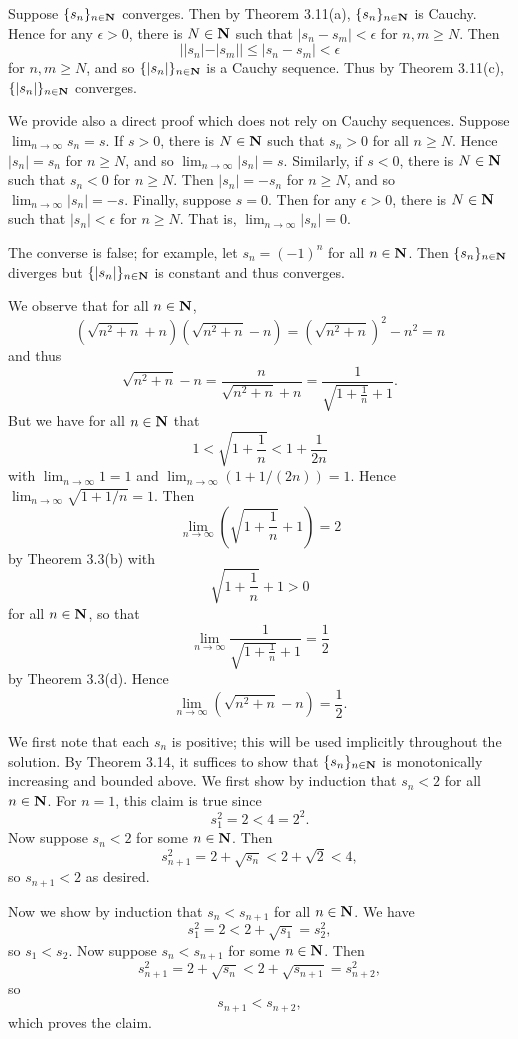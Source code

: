\begin{ex}
Suppose $\{s_n\}_{n \in \mathbf{N}}$ converges. Then by Theorem 3.11(a), $\{s_n\}_{n \in \mathbf{N}}$ is Cauchy. Hence for any $\epsilon > 0$, there is $N \in \mathbf{N}$ such that $|s_n-s_m| < \epsilon$ for $n, m \geq N$. Then \[||s_n|-|s_m|| \leq |s_n-s_m| < \epsilon\] for $n, m \geq N$, and so $\{|s_n|\}_{n \in \mathbf{N}}$ is a Cauchy sequence. Thus by Theorem 3.11(c), $\{|s_n|\}_{n \in \mathbf{N}}$ converges.

We provide also a direct proof which does not rely on Cauchy sequences. Suppose $\lim_{n\to\infty}s_n = s$. If $s > 0$, there is $N \in \mathbf{N}$ such that $s_n > 0$ for all $n \geq N$. Hence $|s_n| = s_n$ for $n \geq N$, and so $\lim_{n\to\infty}|s_n| = s$. Similarly, if $s < 0$, there is $N \in \mathbf{N}$ such that $s_n < 0$ for $n \geq N$. Then $|s_n| = -s_n$ for $n \geq N$, and so $\lim_{n\to\infty}|s_n| = -s$. Finally, suppose $s = 0$. Then for any $\epsilon > 0$, there is $N \in \mathbf{N}$ such that $|s_n| < \epsilon$ for $n \geq N$. That is, $\lim_{n\to\infty}|s_n| = 0$.

The converse is false; for example, let $s_n = (-1)^n$ for all $n \in \mathbf{N}$. Then $\{s_n\}_{n \in \mathbf{N}}$ diverges but $\{|s_n|\}_{n \in \mathbf{N}}$ is constant and thus converges.
\end{ex}

\begin{ex}
We observe that for all $n \in \mathbf{N}$, \[\left(\sqrt{n^2 + n} + n\right)\left(\sqrt{n^2 + n} - n\right) = \left(\sqrt{n^2 + n}\right)^2 - n^2 = n\] and thus \[\sqrt{n^2 + n} - n = \frac{n}{\sqrt{n^2 + n} + n} = \frac{1}{\sqrt{1 + \frac{1}{n}} + 1}.\] But we have for all $n \in \mathbf{N}$ that \[1 < \sqrt{1 + \frac{1}{n}} < 1 + \frac{1}{2n}\] with $\lim_{n\to\infty}1 = 1$ and $\lim_{n\to\infty}(1 + 1/(2n)) = 1$. Hence $\lim_{n\to\infty}\sqrt{1 + 1/n} = 1$. Then \[\lim_{n\to\infty}\left(\sqrt{1 + \frac{1}{n}} + 1\right) = 2\] by Theorem 3.3(b) with \[\sqrt{1 + \frac{1}{n}} + 1 > 0\] for all $n \in \mathbf{N}$, so that \[\lim_{n\to\infty}\frac{1}{\sqrt{1 + \frac{1}{n}} + 1} = \frac{1}{2}\] by Theorem 3.3(d). Hence \[\lim_{n\to\infty}\left(\sqrt{n^2 + n} - n\right) = \frac{1}{2}.\]
\end{ex}

\begin{ex}
We first note that each $s_n$ is positive; this will be used implicitly throughout the solution. By Theorem 3.14, it suffices to show that $\{s_n\}_{n \in \mathbf{N}}$ is monotonically increasing and bounded above. We first show by induction that $s_n < 2$ for all $n \in \mathbf{N}$. For $n = 1$, this claim is true since \[s_1^2 = 2 < 4 = 2^2.\] Now suppose $s_n < 2$ for some $n \in \mathbf{N}$. Then \[s_{n+1}^2 = 2 + \sqrt{s_n} < 2 + \sqrt{2} < 4,\] so $s_{n+1} < 2$ as desired.

Now we show by induction that $s_n < s_{n+1}$ for all $n \in \mathbf{N}$. We have \[s_1^2 = 2 < 2 + \sqrt{s_1} = s_2^2,\] so $s_1 < s_2$. Now suppose $s_n < s_{n+1}$ for some $n \in \mathbf{N}$. Then \[s_{n+1}^2 = 2 + \sqrt{s_n} < 2 + \sqrt{s_{n+1}} = s_{n+2}^2,\] so \[s_{n+1} < s_{n+2},\] which proves the claim.
\end{ex}

